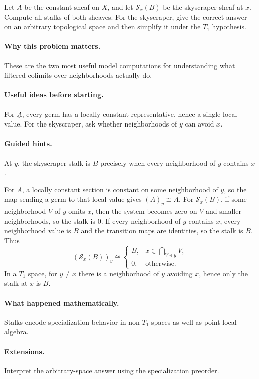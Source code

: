 \begin{problem}
Let $\underline A$ be the constant sheaf on $X$, and let $\mathcal S_x(B)$ be the skyscraper sheaf at $x$. Compute all stalks of both sheaves. For the skyscraper, give the correct answer on an arbitrary topological space and then simplify it under the $T_1$ hypothesis.
\end{problem}

\paragraph{Why this problem matters.}
These are the two most useful model computations for understanding what filtered colimits over neighborhoods actually do.

\paragraph{Useful ideas before starting.}
For $\underline A$, every germ has a locally constant representative, hence a single local value. For the skyscraper, ask whether neighborhoods of $y$ can avoid $x$.

\paragraph{Guided hints.}
At $y$, the skyscraper stalk is $B$ precisely when every neighborhood of $y$ contains $x$.

\ifdefined\FullProblemDossiers
\begin{solution}
For $\underline A$, a locally constant section is constant on some neighborhood of $y$, so the map sending a germ to that local value gives $(\underline A)_y\cong A$. For $\mathcal S_x(B)$, if some neighborhood $V$ of $y$ omits $x$, then the system becomes zero on $V$ and smaller neighborhoods, so the stalk is $0$. If every neighborhood of $y$ contains $x$, every neighborhood value is $B$ and the transition maps are identities, so the stalk is $B$. Thus
\[
(\mathcal S_x(B))_y\cong
\begin{cases}B,&x\in\bigcap_{V\ni y}V,\\0,&\text{otherwise.}\end{cases}
\]
In a $T_1$ space, for $y\neq x$ there is a neighborhood of $y$ avoiding $x$, hence only the stalk at $x$ is $B$.
\end{solution}

\paragraph{What happened mathematically.}
Stalks encode specialization behavior in non-$T_1$ spaces as well as point-local algebra.

\paragraph{Extensions.}
Interpret the arbitrary-space answer using the specialization preorder.
\fi
